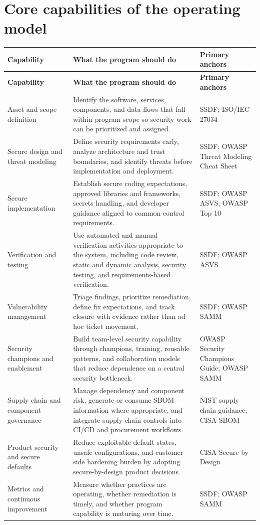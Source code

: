 \documentclass[11pt]{article}
\begin{document}
\section{Core capabilities of the operating model}
\renewcommand{\arraystretch}{1.2}
\begin{longtable}{>{\RaggedRight\arraybackslash}p{} >{\RaggedRight\arraybackslash}p{} >{\RaggedRight\arraybackslash}p{}}
\toprule
\textbf{Capability} & \textbf{What the program should do} & \textbf{Primary anchors} \\
\midrule
\endfirsthead
\toprule
\textbf{Capability} & \textbf{What the program should do} & \textbf{Primary anchors} \\
\midrule
\endhead
Asset and scope definition & Identify the software, services, components, and data flows that fall within program scope so security work can be prioritized and assigned. & SSDF; ISO/IEC 27034 \\
Secure design and threat modeling & Define security requirements early, analyze architecture and trust boundaries, and identify threats before implementation and deployment. & SSDF; OWASP Threat Modeling Cheat Sheet \\
Secure implementation & Establish secure coding expectations, approved libraries and frameworks, secrets handling, and developer guidance aligned to common control requirements. & SSDF; OWASP ASVS; OWASP Top 10 \\
Verification and testing & Use automated and manual verification activities appropriate to the system, including code review, static and dynamic analysis, security testing, and requirements-based verification. & SSDF; OWASP ASVS \\
Vulnerability management & Triage findings, prioritize remediation, define fix expectations, and track closure with evidence rather than ad hoc ticket movement. & SSDF; OWASP SAMM \\
Security champions and enablement & Build team-level security capability through champions, training, reusable patterns, and collaboration models that reduce dependence on a central security bottleneck. & OWASP Security Champions Guide; OWASP SAMM \\
Supply chain and component governance & Manage dependency and component risk, generate or consume SBOM information where appropriate, and integrate supply chain controls into CI/CD and procurement workflows. & NIST supply chain guidance; CISA SBOM \\
Product security and secure defaults & Reduce exploitable default states, unsafe configurations, and customer-side hardening burden by adopting secure-by-design product decisions. & CISA Secure by Design \\
Metrics and continuous improvement & Measure whether practices are operating, whether remediation is timely, and whether program capability is maturing over time. & SSDF; OWASP SAMM \\
\bottomrule
\end{longtable}
\end{document}

